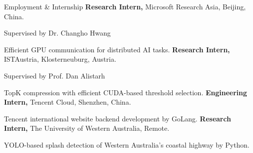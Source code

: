 \begin{rubric}{Employment \& Internship}
%
	\textbf{Research Intern,} Microsoft Research Asia, Beijing, China.
	\par Supervised by Dr. Changho Hwang
	\par Efficient GPU communication for distributed AI tasks.
%
%
	\textbf{Research Intern,} ISTAustria, Klosterneuburg, Austria.
	\par Supervised by Prof. Dan Alistarh
	\par TopK compression with efficient CUDA-based threshold selection.
%
%
	\textbf{Engineering Intern,} Tencent Cloud, Shenzhen, China.
	\par Tencent international website backend development by GoLang.
%
%
	\textbf{Research Intern,} The University of Western Australia, Remote.
	\par YOLO-based splash detection of Western Australia's coastal highway by Python.
\end{rubric}